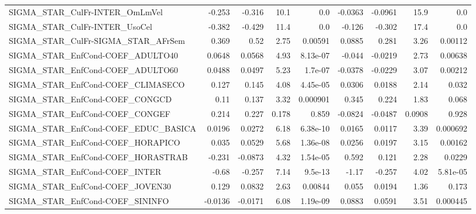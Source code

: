 \begin{tabular}{lrrrrrrrr}
SIGMA\_STAR\_CulFr-INTER\_OmLmVel        &      -0.253 &       -0.316 &    10.1 &      0.0 &    -0.0363 &     -0.0961 &         15.9 &           0.0 \\
SIGMA\_STAR\_CulFr-INTER\_UsoCel         &      -0.382 &       -0.429 &    11.4 &      0.0 &     -0.126 &      -0.302 &         17.4 &           0.0 \\
SIGMA\_STAR\_CulFr-SIGMA\_STAR\_AFrSem    &       0.369 &         0.52 &    2.75 &  0.00591 &     0.0885 &       0.281 &         3.26 &       0.00112 \\
SIGMA\_STAR\_EnfCond-COEF\_ADULTO40      &      0.0648 &       0.0568 &    4.93 & 8.13e-07 &     -0.044 &     -0.0219 &         2.73 &       0.00638 \\
SIGMA\_STAR\_EnfCond-COEF\_ADULTO60      &      0.0488 &       0.0497 &    5.23 &  1.7e-07 &    -0.0378 &     -0.0229 &         3.07 &       0.00212 \\
SIGMA\_STAR\_EnfCond-COEF\_CLIMASECO     &       0.127 &        0.145 &    4.08 & 4.45e-05 &     0.0306 &      0.0188 &         2.14 &         0.032 \\
SIGMA\_STAR\_EnfCond-COEF\_CONGCD        &        0.11 &        0.137 &    3.32 & 0.000901 &      0.345 &       0.224 &         1.83 &         0.068 \\
SIGMA\_STAR\_EnfCond-COEF\_CONGEF        &       0.214 &        0.227 &   0.178 &    0.859 &    -0.0824 &     -0.0487 &       0.0908 &         0.928 \\
SIGMA\_STAR\_EnfCond-COEF\_EDUC\_BASICA   &      0.0196 &       0.0272 &    6.18 & 6.38e-10 &     0.0165 &      0.0117 &         3.39 &      0.000692 \\
SIGMA\_STAR\_EnfCond-COEF\_HORAPICO      &       0.035 &       0.0529 &    5.68 & 1.36e-08 &     0.0256 &      0.0197 &         3.15 &       0.00162 \\
SIGMA\_STAR\_EnfCond-COEF\_HORASTRAB     &      -0.231 &      -0.0873 &    4.32 & 1.54e-05 &      0.592 &       0.121 &         2.28 &        0.0229 \\
SIGMA\_STAR\_EnfCond-COEF\_INTER         &       -0.68 &       -0.257 &    7.14 &  9.5e-13 &      -1.17 &      -0.257 &         4.02 &      5.81e-05 \\
SIGMA\_STAR\_EnfCond-COEF\_JOVEN30       &       0.129 &       0.0832 &    2.63 &  0.00844 &      0.055 &      0.0194 &         1.36 &         0.173 \\
SIGMA\_STAR\_EnfCond-COEF\_SININFO       &     -0.0136 &      -0.0171 &    6.08 & 1.19e-09 &     0.0883 &      0.0591 &         3.51 &      0.000445 \\

\end{tabular}
